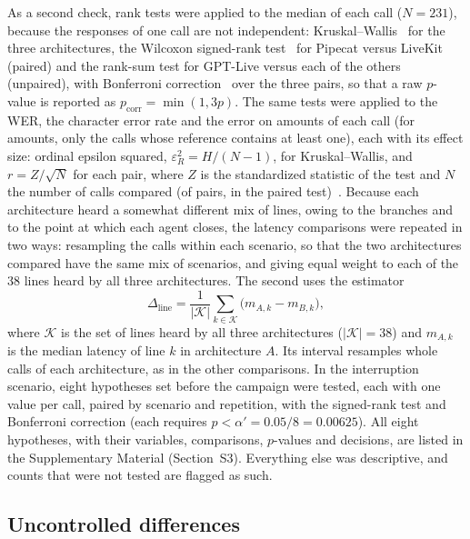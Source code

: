 \documentclass[11pt]{article}
\newcommand{\RIntPruebaAlfa}{0.00625}
\newcommand{\RKwN}{231}
\newcommand{\RLineaN}{38}
\begin{document}
As a second check, rank tests were applied to the median of each call ($N=\RKwN$),
because the responses of one call are not independent: Kruskal--Wallis~\cite{kruskal1952}
for the three architectures, the Wilcoxon signed-rank test~\cite{wilcoxon1945} for Pipecat versus LiveKit (paired) and the rank-sum test for GPT-Live versus each of the others (unpaired),
with Bonferroni correction~\cite{dunn1961} over the three pairs, so that a raw $p$-value is reported as $p_{\text{corr}}=\min(1,3p)$. The same tests were
applied to the WER, the character error rate and the error on amounts of each call (for amounts, only the calls whose reference contains at least one), each with its effect size: ordinal epsilon squared, $\varepsilon^2_R=H/(N-1)$, for Kruskal--Wallis, and $r=Z/\sqrt{N}$ for each pair, where $Z$ is the standardized statistic of the test and $N$ the number of calls compared (of pairs, in the paired test)~\cite{peres2026}. Because each architecture heard a somewhat different mix of
lines, owing to the branches and to the point at which each agent closes, the latency
comparisons were repeated in two ways: resampling the calls within each scenario, so that the two architectures compared have the same mix of scenarios, and giving equal weight to each of the \RLineaN{} lines heard by all three architectures. The second uses the estimator
\begin{equation}
\Delta_{\text{line}}=\frac{1}{|\mathcal{K}|}\sum_{k\in\mathcal{K}}\bigl(m_{A,k}-m_{B,k}\bigr),
\label{eq:linea}
\end{equation}
where $\mathcal{K}$ is the set of lines heard by all three architectures ($|\mathcal{K}|=\RLineaN$) and $m_{A,k}$ is the median latency of line $k$ in architecture $A$. Its interval resamples whole calls of each architecture, as in the other comparisons. In the interruption scenario,
eight hypotheses set before the campaign were tested, each with one value per call,
paired by scenario and repetition, with the signed-rank test and Bonferroni correction
(each requires $p<\alpha'=0.05/8=\RIntPruebaAlfa$). All eight hypotheses, with their variables, comparisons, $p$-values and decisions, are listed in the Supplementary Material (Section~S3). Everything else was descriptive, and counts that were not tested are flagged as such.

\subsection{Uncontrolled differences}\label{sec:asimetrias}
\end{document}
